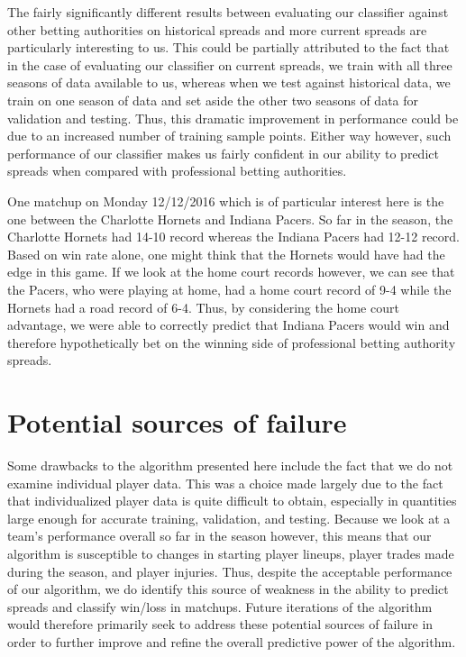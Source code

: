 \documentclass{article}
\begin{document}
The fairly significantly different results between evaluating our classifier against other betting authorities on historical spreads and more current spreads are particularly interesting to us. This could be partially attributed to the fact that in the case of evaluating our classifier on current spreads, we train with all three seasons of data available to us, whereas when we test against historical data, we train on one season of data and set aside the other two seasons of data for validation and testing. Thus, this dramatic improvement in performance could be due to an increased number of training sample points. Either way however, such performance of our classifier makes us fairly confident in our ability to predict spreads when compared with professional betting authorities.

One matchup on Monday 12/12/2016 which is of particular interest here is the one between the Charlotte Hornets and Indiana Pacers. So far in the season, the Charlotte Hornets had 14-10 record whereas the Indiana Pacers had 12-12 record. Based on win rate alone, one might think that the Hornets would have had the edge in this game. If we look at the home court records however, we can see that the Pacers, who were playing at home, had a home court record of 9-4 while the Hornets had a road record of 6-4. Thus, by considering the home court advantage, we were able to correctly predict that Indiana Pacers would win and therefore hypothetically bet on the winning side of professional betting authority spreads.

\section{Potential sources of failure}
Some drawbacks to the algorithm presented here include the fact that we do not examine individual player data. This was a choice made largely due to the fact that individualized player data is quite difficult to obtain, especially in quantities large enough for accurate training, validation, and testing. Because we look at a team's performance overall so far in the season however, this means that our algorithm is susceptible to changes in starting player lineups, player trades made during the season, and player injuries. Thus, despite the acceptable performance of our algorithm, we do identify this source of weakness in the ability to predict spreads and classify win/loss in matchups. Future iterations of the algorithm would therefore primarily seek to address these potential sources of failure in order to further improve and refine the overall predictive power of the algorithm.
\end{document}
